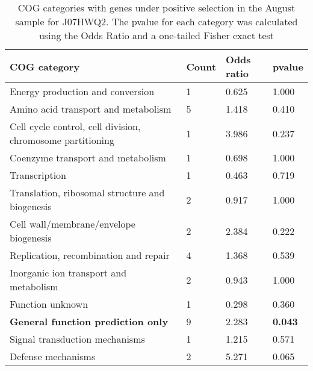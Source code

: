 \begin{table}[hb]
\footnotesize 
	\tabcolsep=0.11cm 
\caption{COG categories with genes under positive selection in the August sample for J07HWQ2. The pvalue for each category was calculated using the Odds Ratio and a one-tailed Fisher exact test} 
\begin{tabularx}{\textwidth}{L{6cm}R{2cm}R{2cm}R{2cm}} 
\hline 
\textbf{COG category} & \textbf{Count} & \textbf{Odds ratio} & \textbf{pvalue} \\ 
\hline 
Energy production and conversion & 1 & 0.625 & 1.000 \\ 
Amino acid transport and metabolism & 5 & 1.418 & 0.410 \\ 
Cell cycle control, cell division, chromosome partitioning & 1 & 3.986 & 0.237 \\ 
Coenzyme transport and metabolism & 1 & 0.698 & 1.000 \\ 
Transcription & 1 & 0.463 & 0.719 \\ 
Translation, ribosomal structure and biogenesis & 2 & 0.917 & 1.000 \\ 
Cell wall/membrane/envelope biogenesis & 2 & 2.384 & 0.222 \\ 
Replication, recombination and repair & 4 & 1.368 & 0.539 \\ 
Inorganic ion transport and metabolism & 2 & 0.943 & 1.000 \\ 
Function unknown & 1 & 0.298 & 0.360 \\ 
\textbf{General function prediction only} & 9 & 2.283 & \textbf{0.043} \\ 
Signal transduction mechanisms & 1 & 1.215 & 0.571 \\ 
Defense mechanisms & 2 & 5.271 & 0.065 \\ 
\end{tabularx} 
\label{August_COG_Selection_J07HWQ2} 
 \end{table} 

